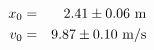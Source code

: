 \begin{eqnarray*}
x_0 & = & 2.41 \pm 0.06 ~{\rm m}\\
v_0 & = & 9.87 \pm 0.10 ~{\rm m}/{\rm s}\\
\end{eqnarray*}
